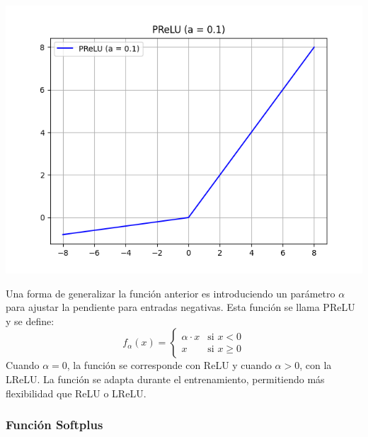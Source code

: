 \begin{minipage}{0.35\textwidth}
    \includegraphics[width=1.1\textwidth]{img/PReLU.png}
    \label{img: PReLU}
\end{minipage}
\begin{minipage}{0.05\textwidth}
\textbf{ }
\end{minipage}
\begin{minipage}{0.6\textwidth}
    Una forma de generalizar la función anterior es introduciendo un parámetro \(\alpha\) para ajustar la pendiente para entradas negativas. Esta función se llama PReLU y se define:
\begin{equation}
    f_{\alpha}(x) = 
    \begin{cases} 
      \alpha \cdot x & \text{si } x < 0 \\ 
      x & \text{si } x \geq 0 
    \end{cases}
    \label{eq:prelu}
\end{equation}
Cuando $\alpha = 0$, la función se corresponde con ReLU y cuando $\alpha > 0$, con la LReLU. La función se adapta durante el entrenamiento, permitiendo más flexibilidad que ReLU o LReLU. 
\end{minipage}

\subsubsection*{Función Softplus}

